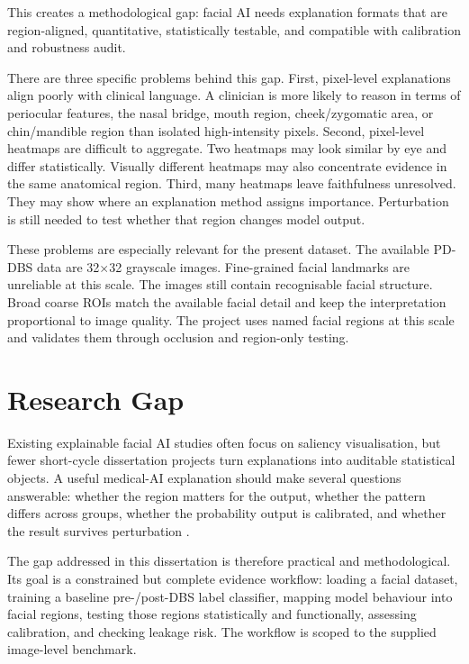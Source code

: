This creates a methodological gap: facial AI needs explanation formats that are region-aligned, quantitative, statistically testable, and compatible with calibration and robustness audit.


There are three specific problems behind this gap. First, pixel-level explanations align poorly with clinical language. A clinician is more likely to reason in terms of periocular features, the nasal bridge, mouth region, cheek/zygomatic area, or chin/mandible region than isolated high-intensity pixels. Second, pixel-level heatmaps are difficult to aggregate. Two heatmaps may look similar by eye and differ statistically. Visually different heatmaps may also concentrate evidence in the same anatomical region. Third, many heatmaps leave faithfulness unresolved. They may show where an explanation method assigns importance. Perturbation is still needed to test whether that region changes model output.


These problems are especially relevant for the present dataset. The available PD-DBS data are 32$\times$32 grayscale images. Fine-grained facial landmarks are unreliable at this scale. The images still contain recognisable facial structure. Broad coarse ROIs match the available facial detail and keep the interpretation proportional to image quality. The project uses named facial regions at this scale and validates them through occlusion and region-only testing.


\section{Research Gap}

Existing explainable facial AI studies often focus on saliency visualisation, but fewer short-cycle dissertation projects turn explanations into auditable statistical objects. A useful medical-AI explanation should make several questions answerable: whether the region matters for the output, whether the pattern differs across groups, whether the probability output is calibrated, and whether the result survives perturbation    .


The gap addressed in this dissertation is therefore practical and methodological. Its goal is a constrained but complete evidence workflow: loading a facial dataset, training a baseline pre-/post-DBS label classifier, mapping model behaviour into facial regions, testing those regions statistically and functionally, assessing calibration, and checking leakage risk. The workflow is scoped to the supplied image-level benchmark.


